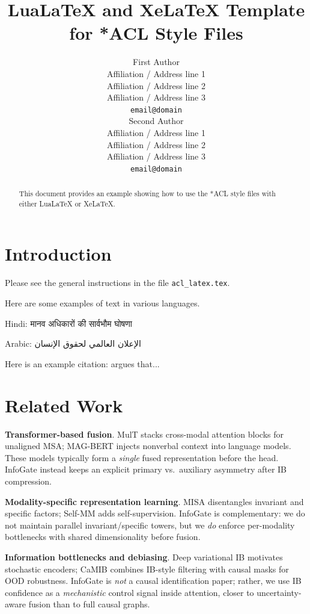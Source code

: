 \documentclass[11pt]{article}
\title{LuaLaTeX and XeLaTeX Template for *ACL Style Files}
\author{First Author \\
  Affiliation / Address line 1 \\
  Affiliation / Address line 2 \\
  Affiliation / Address line 3 \\
  \texttt{email@domain} \\\And
  Second Author \\
  Affiliation / Address line 1 \\
  Affiliation / Address line 2 \\
  Affiliation / Address line 3 \\
  \texttt{email@domain} \\}
\begin{document}
\maketitle
\begin{abstract}
This document provides an example showing how
to use the *ACL style files with either
LuaLaTeX or XeLaTeX.
\end{abstract}


\section{Introduction}

Please see the general instructions
in the file \verb|acl_latex.tex|.

Here are some examples of text in various languages.

Hindi: \foreignlanguage{hindi}{मानव अधिकारों की सार्वभौम घोषणा}

Arabic: \foreignlanguage{arabic}{الإعلان العالمي لحقوق الإنسان}

Here is an example citation:
\citet{Gusfield:97} argues that...


\section{Related Work}
\label{sec:related}

\noindent \textbf{Transformer-based fusion}.
MulT \citep{tsai2019multimodal} stacks cross-modal attention blocks for unaligned
MSA; MAG-BERT \citep{rahman2020integrating} injects nonverbal context into
language models.
These models typically form a \emph{single} fused representation before the head.
InfoGate instead keeps an explicit primary vs.\ auxiliary asymmetry after IB
compression.

\noindent \textbf{Modality-specific representation learning}.
MISA \citep{hazarika2020misa} disentangles invariant and specific factors; Self-MM
\citep{yu2021learning} adds self-supervision.
InfoGate is complementary: we do not maintain parallel invariant/specific
towers, but we \emph{do} enforce per-modality bottlenecks with shared
dimensionality before fusion.

\noindent \textbf{Information bottlenecks and debiasing}.
Deep variational IB \citep{alemi2017deep} motivates stochastic encoders; CaMIB
\citep{jiang2025towards} combines IB-style filtering with causal masks for OOD
robustness.
InfoGate is \emph{not} a causal identification paper; rather, we use IB
confidence as a \emph{mechanistic} control signal inside attention, closer to
uncertainty-aware fusion than to full causal graphs.
\end{document}
